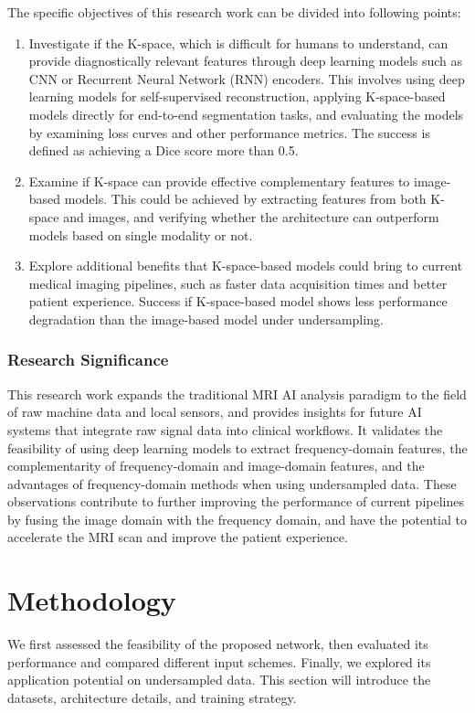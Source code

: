 \documentclass[12pt,a4paper]{article}
\begin{document}
The specific objectives of this research work can be divided into following points:
\begin{enumerate}
\item Investigate if the K-space, which is difficult for humans to understand, can provide diagnostically relevant features through deep learning models such as CNN or Recurrent Neural Network (RNN) encoders. This involves using deep learning models for self-supervised reconstruction, applying K-space-based models directly for end-to-end segmentation tasks, and evaluating the models by examining loss curves and other performance metrics. The success is defined as achieving a Dice score more than 0.5.
\item Examine if K-space can provide effective complementary features to image-based models. This could be achieved by extracting features from both K-space and images, and verifying whether the architecture can outperform models based on single modality or not.
\item Explore additional benefits that K-space-based models could bring to current medical imaging pipelines, such as faster data acquisition times and better patient experience. Success if K-space-based model shows less performance degradation than the image-based model under undersampling.
\end{enumerate}

\subsubsection{Research Significance}
This research work expands the traditional MRI AI analysis paradigm to the field of raw machine data and local sensors, and provides insights for future AI systems that integrate raw signal data into clinical workflows. It validates the feasibility of using deep learning models to extract frequency-domain features, the complementarity of frequency-domain and image-domain features, and the advantages of frequency-domain methods when using undersampled data. These observations contribute to further improving the performance of current pipelines by fusing the image domain with the frequency domain, and have the potential to accelerate the MRI scan and improve the patient experience.



\section{Methodology}
We first assessed the feasibility of the proposed network, then evaluated its performance and compared different input schemes. Finally, we explored its application potential on undersampled data. This section will introduce the datasets, architecture details, and training strategy.
\end{document}
